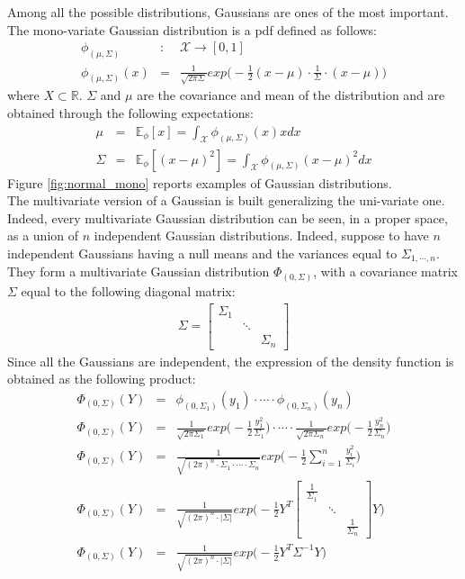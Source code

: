 \documentclass{article}
\begin{document}
Among all the possible distributions, Gaussians are ones of the most important. The mono-variate Gaussian distribution is a pdf defined as follows:
\begin{eqnarray}
\phi _{(\mu,\Sigma)}&:&\mathcal{X} \rightarrow [0,1] \\
\phi _{(\mu,\Sigma)}(x) &=& \frac{1}{\sqrt{2 \pi \Sigma }} exp \bigg( -\frac{1}{2} (x-\mu) \cdot \frac{1}{\Sigma} \cdot (x-\mu) \bigg)
\label{eq:Gauss_pdf}
\end{eqnarray}
where $X \subset \mathbb{R}$.
$\Sigma$ and $\mu$ are the covariance and mean of the distribution and are obtained through the following expectations:
\begin{eqnarray}
\mu &=& \mathbb{E}_{\phi}[x] = \int_{\mathcal{X}} \phi_{(\mu, \Sigma)}(x)x dx \\
\Sigma &=& \mathbb{E}_{\phi}[(x-\mu)^2] = \int_{\mathcal{X}} \phi_{(\mu, \Sigma)}(x-\mu)^2 dx
\end{eqnarray}
Figure \ref{fig:normal_mono} reports examples of Gaussian distributions.
\\
The multivariate version of a Gaussian is built generalizing the uni-variate one. Indeed, every multivariate Gaussian distribution can be seen, in a proper space, as a union of $n$ independent Gaussian distributions. Indeed, suppose to have $n$ independent Gaussians having a null means and the variances equal to $\Sigma_{1,\cdots,n}$.
They form a multivariate Gaussian distribution $\Phi_{(0, \Sigma)}$, with a covariance matrix $\Sigma$ equal to the following diagonal matrix:
\begin{eqnarray}
\Sigma = \begin{bmatrix}
\Sigma_1 &  & \\ 
 & \ddots & \\ 
 &  & \Sigma_n
\end{bmatrix}
\end{eqnarray} 
Since all the Gaussians are independent, the expression of the density function is obtained as the following product:
\begin{eqnarray}
\Phi_{(0, \Sigma)}(Y) &=& \phi_{(0,\Sigma_1)}(y_1) \cdot \cdots \cdot \phi_{(0,\Sigma_n)}(y_n) \\
\Phi_{(0, \Sigma)}(Y) &=&  \frac{1}{\sqrt{2 \pi \Sigma_1}} exp \bigg( -\frac{1}{2} \frac{y_1^2}{\Sigma_1}  \bigg) \cdot \cdots \cdot \frac{1}{\sqrt{2 \pi \Sigma_n}} exp \bigg( -\frac{1}{2} \frac{y_n^2}{\Sigma_n} \bigg) \\
\Phi_{(0, \Sigma)}(Y) &=& \frac{1}{\sqrt{ {(2 \pi)}^n \cdot \Sigma_1 \cdot \cdots \cdot \Sigma_n }  } exp \bigg( -\frac{1}{2} \sum_{i=1}^n \frac{y_i^2}{\Sigma_i}  \bigg) \\
\Phi_{(0, \Sigma)}(Y) &=& \frac{1}{\sqrt{ {(2 \pi)}^n \cdot \left | \Sigma \right | }  } exp \bigg( -\frac{1}{2} Y^T \begin{bmatrix}
\frac{1}{\Sigma_1} &  & \\ 
 & \ddots & \\ 
 &  & \frac{1}{\Sigma_n}
\end{bmatrix} Y \bigg) \\
\Phi_{(0, \Sigma)}(Y) &=& \frac{1}{\sqrt{ {(2 \pi)}^n \cdot \left | \Sigma \right | }  } exp \bigg( -\frac{1}{2} Y^T \Sigma^{-1} Y \bigg)
\end{eqnarray}
\end{document}
